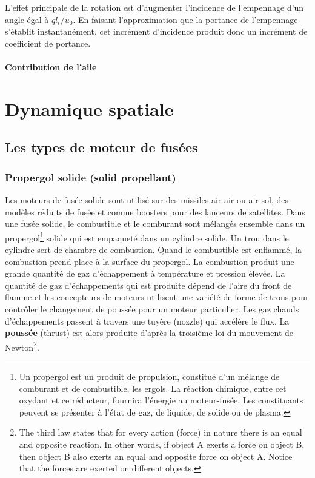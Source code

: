 \documentclass{report}
\begin{document}
L'effet principale de la rotation est d'augmenter l'incidence de l'empennage d'un angle égal à $ql_t/u_0$. En faisant l'approximation que la portance de l'empennage s'établit instantanément, cet incrément d'incidence produit donc un incrément de coefficient de portance.

\subsubsection{Contribution de l'aile}

\newpage

\chapter{Dynamique spatiale}

\section{Les types de moteur de fusées}
\subsection{Propergol solide (solid propellant)}

Les moteurs de fusée solide sont utilisé sur des missiles air-air ou air-sol, des modèles réduits de fusée et comme boosters pour des lanceurs de satellites. Dans une fusée solide, le combustible et le comburant sont mélangés ensemble dans un propergol\footnote{Un propergol est un produit de propulsion, constitué d'un mélange de comburant et de combustible, les ergols. La réaction chimique, entre cet oxydant et ce réducteur, fournira l'énergie au moteur-fusée. Les constituants peuvent se présenter à l'état de gaz, de liquide, de solide ou de plasma.} solide qui est empaqueté dans un cylindre solide. Un trou dans le cylindre sert de chambre de combustion. Quand le combustible est enflammé, la combustion prend place à la surface du propergol. La combustion produit une grande quantité de gaz d'échappement à température et pression élevée. La quantité de gaz d'échappements qui est produite dépend de l'aire du front de flamme et les concepteurs de moteurs utilisent une variété de forme de trous pour contrôler le changement de poussée pour un moteur particulier. Les gaz chauds d'échappements passent à travers une tuyère (nozzle) qui accélère le flux. La \textbf{poussée} (thrust) est alors produite d'après la troisième loi du mouvement de Newton\footnote{The third law states that for every action (force) in nature there is an equal and opposite reaction. In other words, if object A exerts a force on object B, then object B also exerts an equal and opposite force on object A. Notice that the forces are exerted on different objects.}.
\end{document}
